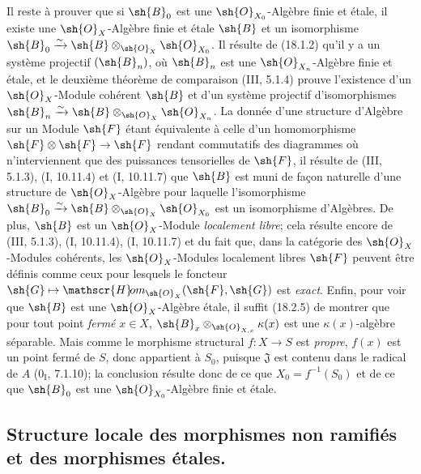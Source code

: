 Il reste à prouver que si $\sh{B}_0$ est une $\sh{O}_{X_0}$-Algèbre finie et étale, il existe une $\sh{O}_X$-Algèbre finie et étale $\sh{B}$ et un isomorphisme $\sh{B}_0\xrightarrow{\sim}\sh{B}\otimes_{\sh{O}_X}\sh{O}_{X_0}$. Il résulte de (18.1.2) qu'il y a un système projectif $(\sh{B}_n)$, où $\sh{B}_n$ est une $\sh{O}_{X_n}$-Algèbre finie et étale, et le deuxième théorème de comparaison (III, 5.1.4) prouve l'existence d'un $\sh{O}_X$-Module cohérent $\sh{B}$ et d'un système projectif d'isomorphismes $\sh{B}_n\xrightarrow{\sim}\sh{B}\otimes_{\sh{O}_X}\sh{O}_{X_n}$. La donnée d'une structure d'Algèbre sur un Module $\sh{F}$ étant équivalente à celle d'un homomorphisme $\sh{F}\otimes\sh{F}\to\sh{F}$ rendant commutatifs des diagrammes où n'interviennent que des puissances tensorielles de $\sh{F}$, il résulte de (III, 5.1.3), (I, 10.11.4) et (I, 10.11.7) que $\sh{B}$ est muni de façon naturelle d'une structure de $\sh{O}_X$-Algèbre pour laquelle l'isomorphisme $\sh{B}_0\xrightarrow{\sim}\sh{B}\otimes_{\sh{O}_X}\sh{O}_{X_0}$ est un isomorphisme d'Algèbres. De plus, $\sh{B}$ est un $\sh{O}_X$-Module \emph{localement libre}; cela résulte encore de (III, 5.1.3), (I, 10.11.4), (I, 10.11.7) et du fait que, dans la catégorie des $\sh{O}_X$-Modules cohérents, les $\sh{O}_X$-Modules localement libres $\sh{F}$ peuvent être définis comme ceux pour lesquels le foncteur $\sh{G}\mapsto\mathscr{H}\!om_{\sh{O}_X}(\sh{F},\sh{G})$ est \emph{exact}. Enfin, pour voir que $\sh{B}$ est une $\sh{O}_X$-Algèbre étale, il suffit (18.2.5) de montrer que pour tout point \emph{fermé} $x\in X$, $\sh{B}_x\otimes_{\sh{O}_{X,x}}\kappa(x)$ est une $\kappa(x)$-algèbre séparable. Mais comme le morphisme structural $f:X\to S$ est \emph{propre}, $f(x)$ est un point fermé de $S$, donc appartient à $S_0$, puisque $\mathfrak J$ est contenu dans le radical de $A$ ($0_{\mathrm I}$, 7.1.10); la conclusion résulte donc de ce que $X_0=f^{-1}(S_0)$ et de ce que $\sh{B}_0$ est une $\sh{O}_{X_0}$-Algèbre finie et étale.

\subsection{Structure locale des morphismes non ramifiés et des morphismes étales.}

